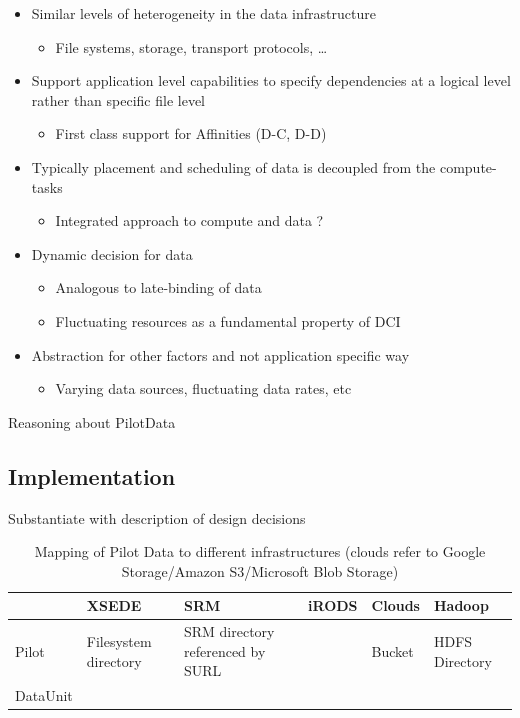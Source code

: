 \documentclass[conference]{IEEEtran}
\begin{document}
\begin{itemize}

\item Similar levels of heterogeneity in the data infrastructure

\begin{itemize}
\item File systems, storage, transport protocols, …
\end{itemize}

\item Support application level capabilities to specify dependencies
  at a logical level rather than specific file level

\begin{itemize}
\item First class support for Affinities (D-C, D-D)
\end{itemize}

\item Typically placement and scheduling of data is decoupled from the compute-tasks

\begin{itemize}
\item Integrated approach to compute and data ?
\end{itemize}

\item Dynamic decision for data

\begin{itemize}
\item Analogous  to late-binding of data
\item Fluctuating resources as a fundamental property of DCI
\end{itemize}

\item Abstraction for other factors and not application specific way
\begin{itemize}
\item Varying data sources, fluctuating data rates, etc
\end{itemize}

\end{itemize}

Reasoning about PilotData

\subsection{Implementation}
Substantiate with description of design decisions


\begin{table}[t]
	\centering
\begin{tabular}{|p{1.3cm}|p{1cm}|p{1cm}|p{1cm}|p{1cm}|p{1cm}|}
	\hline
	&\textbf{XSEDE} &\textbf{SRM} &\textbf{iRODS} &\textbf{Clouds} &\textbf{Hadoop}\\
	\hline
Pilot &Filesystem directory &SRM directory referenced by SURL & &Bucket&HDFS Directory\\
	\hline
DataUnit &&&&&\\
	\hline
\end{tabular}
\caption{Mapping of Pilot Data to different infrastructures (clouds refer to Google Storage/Amazon S3/Microsoft Blob Storage)}
\end{table}
\end{document}
